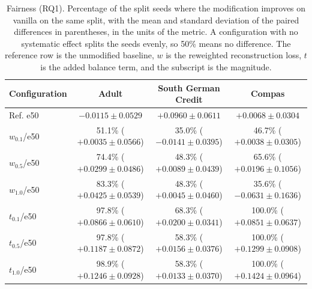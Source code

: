 \begin{table}[t]
\centering
\small
\caption{Fairness (RQ1). Percentage of the split seeds where the modification improves on vanilla on the same split, with the mean and standard deviation of the paired differences in parentheses, in the units of the metric. A configuration with no systematic effect splits the seeds evenly, so 50\% means no difference. The reference row is the unmodified baseline, $w$ is the reweighted reconstruction loss, $t$ is the added balance term, and the subscript is the magnitude.}
\label{tab:stats-fairness}
\begin{tabular}{p{1.5cm}ccc}
\toprule
Configuration & Adult & South German Credit & Compas \\
\midrule
Ref. e50 & $-0.0115 \pm 0.0529$ & $+0.0960 \pm 0.0611$ & $+0.0068 \pm 0.0304$ \\ \hline
$w_{0.1}$/e50 & \makecell{51.1\% \\ ($+0.0035 \pm 0.0566$)} & \makecell{35.0\% \\ ($-0.0141 \pm 0.0395$)} & \makecell{46.7\% \\ ($+0.0038 \pm 0.0305$)} \\ \hdashline
$w_{0.5}$/e50 & \makecell{74.4\% \\ ($+0.0299 \pm 0.0486$)} & \makecell{48.3\% \\ ($+0.0089 \pm 0.0439$)} & \makecell{65.6\% \\ ($+0.0196 \pm 0.1056$)} \\ \hdashline
$w_{1.0}$/e50 & \makecell{83.3\% \\ ($+0.0425 \pm 0.0539$)} & \makecell{48.3\% \\ ($+0.0045 \pm 0.0460$)} & \makecell{35.6\% \\ ($-0.0631 \pm 0.1636$)} \\ \hdashline
$t_{0.1}$/e50 & \makecell{97.8\% \\ ($+0.0866 \pm 0.0610$)} & \makecell{68.3\% \\ ($+0.0200 \pm 0.0341$)} & \makecell{100.0\% \\ ($+0.0851 \pm 0.0637$)} \\ \hdashline
$t_{0.5}$/e50 & \makecell{97.8\% \\ ($+0.1187 \pm 0.0872$)} & \makecell{58.3\% \\ ($+0.0156 \pm 0.0376$)} & \makecell{100.0\% \\ ($+0.1299 \pm 0.0908$)} \\ \hdashline
$t_{1.0}$/e50 & \makecell{98.9\% \\ ($+0.1246 \pm 0.0928$)} & \makecell{58.3\% \\ ($+0.0133 \pm 0.0370$)} & \makecell{100.0\% \\ ($+0.1424 \pm 0.0964$)} \\

\end{tabular}
\end{table}
